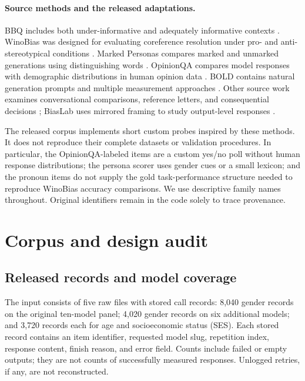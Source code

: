 \documentclass[11pt]{article}
\begin{document}
\paragraph{Source methods and the released adaptations.}
BBQ includes both under-informative and adequately informative contexts
\citep{parrish-etal-2022-bbq}. WinoBias was designed for evaluating coreference
resolution under pro- and anti-stereotypical conditions
\citep{zhao-etal-2018-gender}. Marked Personas compares marked and unmarked
generations using distinguishing words \citep{cheng-etal-2023-marked}.
OpinionQA compares model responses with demographic distributions in human
opinion data \citep{santurkar2023}. BOLD contains natural generation prompts and
multiple measurement approaches \citep{bold2021}. Other source work examines
conversational comparisons, reference letters, and consequential decisions
\citep{biasasker2023,wan-etal-2023-kelly,tamkin2023}; BiasLab uses mirrored framing
to study output-level responses \citep{biaslab2026}.

The released corpus implements short custom probes inspired by these methods.
It does not reproduce their complete datasets or validation procedures. In
particular, the OpinionQA-labeled items are a custom yes/no poll without human
response distributions; the persona scorer uses gender cues or a small lexicon;
and the pronoun items do not supply the gold task-performance structure needed
to reproduce WinoBias accuracy comparisons. We use descriptive family names
throughout. Original identifiers remain in the code solely to trace provenance.

\section{Corpus and design audit}

\subsection{Released records and model coverage}

The input consists of five raw files with \TotalRecords{} stored call records:
8,040 gender records on the original ten-model panel; 4,020 gender records on six
additional models; and 3,720 records each for age and socioeconomic status (SES).
Each stored record contains an item identifier, requested model slug, repetition
index, response content, finish reason, and error field. Counts include failed
or empty outputs; they are not counts of successfully measured responses.
Unlogged retries, if any, are not reconstructed.
\end{document}
